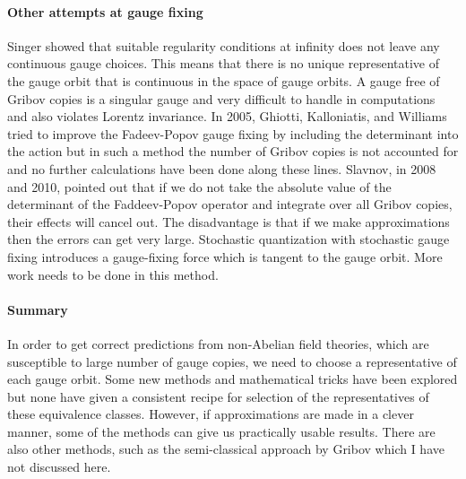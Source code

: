 \paragraph{Other attempts at gauge fixing}
Singer showed that suitable regularity conditions at infinity does not
leave any continuous gauge choices. This means that there is no unique
representative of the gauge orbit that is continuous in the space of
gauge orbits. A gauge free of Gribov copies is a singular gauge and very
difficult to handle in computations and also violates Lorentz
invariance. In 2005, Ghiotti, Kalloniatis, and Williams tried to
improve the Fadeev-Popov gauge fixing by including the determinant into
the action but in such a method the number of Gribov copies is not
accounted for and no further calculations have been done along these
lines. Slavnov, in 2008 and 2010, pointed out that if we do not take
the absolute value of the determinant of the Faddeev-Popov operator and
integrate over all Gribov copies, their effects will cancel out. The
disadvantage is that if we make approximations then the errors can get
very large. 
Stochastic quantization with stochastic gauge fixing
introduces a gauge-fixing force which is tangent to the gauge orbit. More
work needs to be done in this method.

\paragraph{Summary}
In order to get correct predictions from non-Abelian field theories,
which are susceptible to large number of gauge copies, we need to choose
a representative of each gauge orbit. Some new methods and mathematical
tricks have been explored but none have given a consistent recipe for
selection of the representatives of these equivalence classes. However,
if approximations are made in a clever manner, some of the methods can
give us practically usable results. There are also other methods, such as
the semi-classical approach by Gribov  which I have
not discussed here.



\renewcommand{\ssp}{a}
